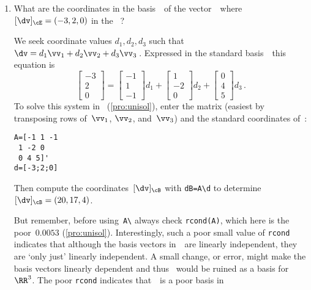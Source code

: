 \begin{example}
\begin{enumerate}
\item What are the coordinates in the basis~\cB\ of the vector~\dv\ where \([\dv]_\cE=(-3,2,0)\) in the ~\cE?
\begin{solution} 
We seek coordinate values \(d_1,d_2,d_3\) such that \(\dv=d_1\vv_1+d_2\vv_2+d_3\vv_3\)\,. 
Expressed in the standard basis~\cE\ this equation is
\begin{equation*}
\begin{bmatrix} -3\\2\\0 \end{bmatrix}=
\begin{bmatrix} -1\\1\\-1 \end{bmatrix}d_1+
\begin{bmatrix} 1\\-2\\0 \end{bmatrix}d_2+
\begin{bmatrix} 0\\4\\5 \end{bmatrix}d_3\,.
\end{equation*}
To solve this system in \script\ (\cref{pro:unisol}), enter the matrix (easiest by transposing rows of~\(\vv_1\), \(\vv_2\), and~\(\vv_3\)) and the standard coordinates of~\dv:
\begin{verbatim}
A=[-1 1 -1
 1 -2 0
 0 4 5]'
d=[-3;2;0]
\end{verbatim}
\setbox\ajrqrbox\hbox{}%
\marginajrbox%
Then compute the coordinates~\([\dv]_\cB\) with \verb|dB=A\d| to determine \([\dv]_\cB=(20,17,4)\).

But remember, before using~\verb|A\| always check \verb|rcond(A)|, which here is the poor~\(0.0053\) (\cref{pro:unisol}).
Interestingly, such a poor small value of \verb|rcond| indicates that although the basis vectors in~\cB\ are linearly independent, they are `only just' linearly independent.
A small change, or error, might make the basis vectors linearly dependent and thus \cB~would be ruined as a basis for~\(\RR^3\).
The poor \verb|rcond| indicates that~\cB\ is a poor basis in 
\end{solution}
\end{enumerate}
\end{example}





